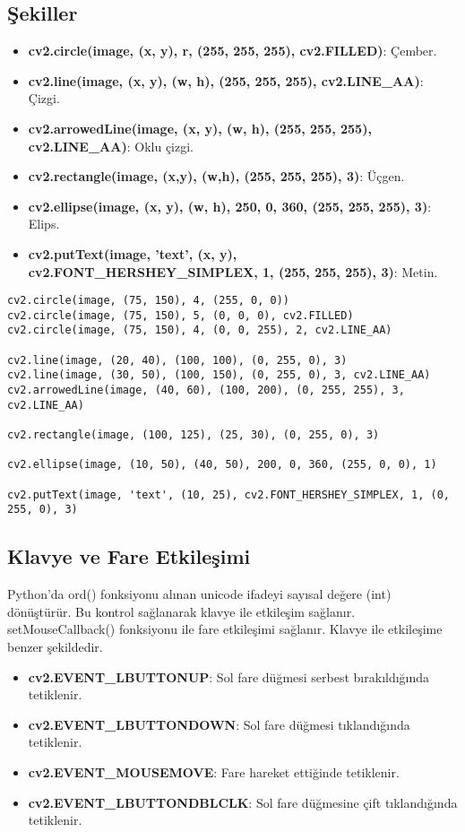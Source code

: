 \subsection{Şekiller}
\begin{itemize}
	\item \textbf{cv2.circle(image, (x, y), r, (255, 255, 255), cv2.FILLED)}: Çember.
	\item \textbf{cv2.line(image, (x, y), (w, h), (255, 255, 255), cv2.LINE\_AA)}: Çizgi.
	\item \textbf{cv2.arrowedLine(image, (x, y), (w, h), (255, 255, 255), cv2.LINE\_AA)}: Oklu çizgi.
	\item \textbf{cv2.rectangle(image, (x,y), (w,h), (255, 255, 255), 3)}: Üçgen.
	\item \textbf{cv2.ellipse(image, (x, y), (w, h), 250, 0, 360, (255, 255, 255), 3)}: Elips.
	\item \textbf{cv2.putText(image, 'text', (x, y), cv2.FONT\_HERSHEY\_SIMPLEX, 1, (255, 255, 255), 3)}: Metin.
\end{itemize}

\begin{lstlisting}
cv2.circle(image, (75, 150), 4, (255, 0, 0))
cv2.circle(image, (75, 150), 5, (0, 0, 0), cv2.FILLED)
cv2.circle(image, (75, 150), 4, (0, 0, 255), 2, cv2.LINE_AA)

cv2.line(image, (20, 40), (100, 100), (0, 255, 0), 3)
cv2.line(image, (30, 50), (100, 150), (0, 255, 0), 3, cv2.LINE_AA)
cv2.arrowedLine(image, (40, 60), (100, 200), (0, 255, 255), 3, cv2.LINE_AA)

cv2.rectangle(image, (100, 125), (25, 30), (0, 255, 0), 3)

cv2.ellipse(image, (10, 50), (40, 50), 200, 0, 360, (255, 0, 0), 1)

cv2.putText(image, 'text', (10, 25), cv2.FONT_HERSHEY_SIMPLEX, 1, (0, 255, 0), 3)
\end{lstlisting}

\subsection{Klavye ve Fare Etkileşimi}
Python'da ord() fonksiyonu alınan unicode ifadeyi sayısal değere (int) dönüştürür. Bu kontrol sağlanarak klavye ile etkileşim sağlanır. setMouseCallback() fonksiyonu ile fare etkileşimi sağlanır. Klavye ile etkileşime benzer şekildedir.
\begin{itemize}
	\item \textbf{cv2.EVENT\_LBUTTONUP}: Sol fare düğmesi serbest bırakıldığında tetiklenir.
	\item \textbf{cv2.EVENT\_LBUTTONDOWN}: Sol fare düğmesi tıklandığında tetiklenir.
	\item \textbf{cv2.EVENT\_MOUSEMOVE}: Fare hareket ettiğinde tetiklenir.
	\item \textbf{cv2.EVENT\_LBUTTONDBLCLK}: Sol fare düğmesine çift tıklandığında tetiklenir.
\end{itemize}


